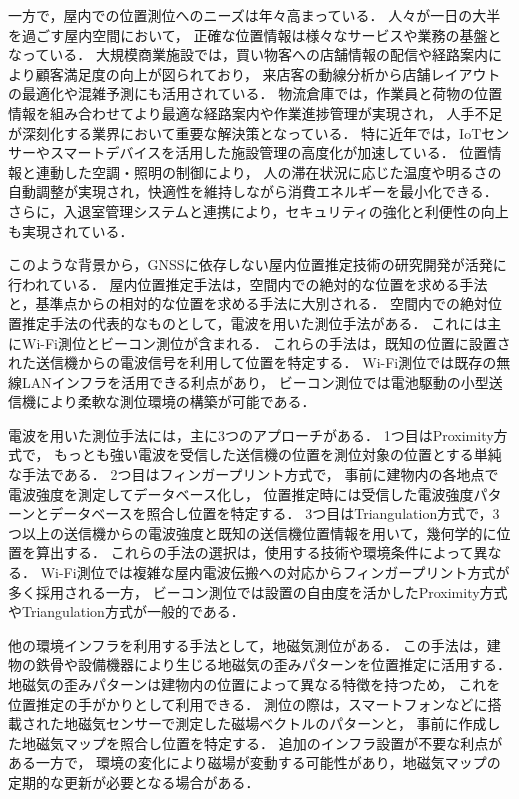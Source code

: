 一方で，屋内での位置測位へのニーズは年々高まっている．
人々が一日の大半を過ごす屋内空間において，
正確な位置情報は様々なサービスや業務の基盤となっている．
大規模商業施設では，買い物客への店舗情報の配信や経路案内により顧客満足度の向上が図られており\cite{burasapo}，
来店客の動線分析から店舗レイアウトの最適化や混雑予測にも活用されている．
物流倉庫では，作業員と荷物の位置情報を組み合わせてより最適な経路案内や作業進捗管理が実現され，
人手不足が深刻化する業界において重要な解決策となっている．
特に近年では，IoTセンサーやスマートデバイスを活用した施設管理の高度化が加速している．
位置情報と連動した空調・照明の制御により，
人の滞在状況に応じた温度や明るさの自動調整が実現され，快適性を維持しながら消費エネルギーを最小化できる．
さらに，入退室管理システムと連携により，セキュリティの強化と利便性の向上も実現されている．

このような背景から，GNSSに依存しない屋内位置推定技術の研究開発が活発に行われている．
屋内位置推定手法は，空間内での絶対的な位置を求める手法と，基準点からの相対的な位置を求める手法に大別される．
空間内での絶対位置推定手法の代表的なものとして，電波を用いた測位手法がある．
これには主にWi-Fi測位とビーコン測位が含まれる．
これらの手法は，既知の位置に設置された送信機からの電波信号を利用して位置を特定する．
Wi-Fi測位では既存の無線LANインフラを活用できる利点があり，
ビーコン測位では電池駆動の小型送信機により柔軟な測位環境の構築が可能である．


電波を用いた測位手法には，主に3つのアプローチがある．
1つ目はProximity方式で，
もっとも強い電波を受信した送信機の位置を測位対象の位置とする単純な手法である．
2つ目はフィンガープリント方式で，
事前に建物内の各地点で電波強度を測定してデータベース化し，
位置推定時には受信した電波強度パターンとデータベースを照合し位置を特定する．
3つ目はTriangulation方式で，3つ以上の送信機からの電波強度と既知の送信機位置情報を用いて，幾何学的に位置を算出する．
これらの手法の選択は，使用する技術や環境条件によって異なる．
Wi-Fi測位では複雑な屋内電波伝搬への対応からフィンガープリント方式が多く採用される一方，
ビーコン測位では設置の自由度を活かしたProximity方式やTriangulation方式が一般的である．

他の環境インフラを利用する手法として，地磁気測位がある．
この手法は，建物の鉄骨や設備機器により生じる地磁気の歪みパターンを位置推定に活用する．
地磁気の歪みパターンは建物内の位置によって異なる特徴を持つため，
これを位置推定の手がかりとして利用できる．
測位の際は，スマートフォンなどに搭載された地磁気センサーで測定した磁場ベクトルのパターンと，
事前に作成した地磁気マップを照合し位置を特定する．
追加のインフラ設置が不要な利点がある一方で，
環境の変化により磁場が変動する可能性があり，地磁気マップの定期的な更新が必要となる場合がある．

